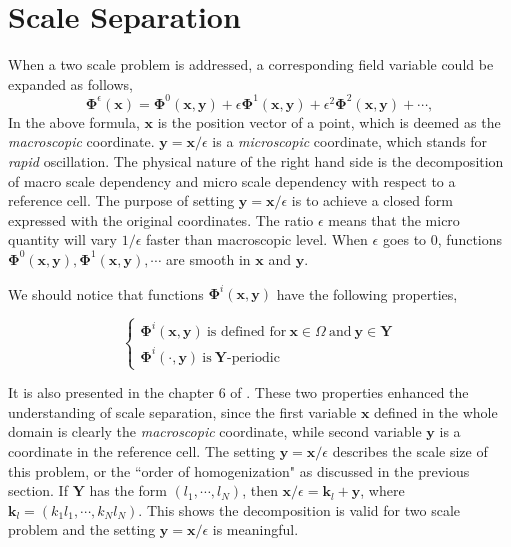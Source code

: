 \documentclass[10pt,a4paper]{scrreprt}
\begin{document}
\section{Scale Separation}
When a two scale problem is addressed, a corresponding field variable could be expanded as follows, 
%
\begin{equation}
\label{eq:field epsi}
\mathbf{\Phi}^{\epsilon}(\mathbf{x}) = \mathbf{\Phi}^{0}(\mathbf{x},\mathbf{y}) + \epsilon\mathbf{\Phi}^{1}(\mathbf{x},\mathbf{y}) + \epsilon^{2} \mathbf{\Phi}^{2}(\mathbf{x},\mathbf{y}) + \cdots,
\end{equation}
%
In the above formula, $\mathbf{x}$ is the position vector of a point, which is deemed as the \textit{macroscopic} coordinate. $\mathbf{y}=\mathbf{x}/\epsilon$ is a \textit{microscopic} coordinate, which stands for \textit{rapid} oscillation. The physical nature of the right hand side is the decomposition of macro scale dependency and micro scale dependency with respect to a reference cell. The purpose of setting $\mathbf{y}=\mathbf{x}/\epsilon$ is to achieve a closed form expressed with the original coordinates. The ratio $\epsilon$ means that the micro quantity will vary $1/\epsilon$ faster than macroscopic level. When $\epsilon$ goes to $0$, functions $\mathbf{\Phi}^{0}(\mathbf{x}, \mathbf{y}), \mathbf{\Phi}^{1}(\mathbf{x}, \mathbf{y}), \cdots$ are smooth in $\mathbf{x}$ and $\mathbf{y}$.

We should notice that functions $\mathbf{\Phi}^{i}(\mathbf{x},\mathbf{y})$ have the following properties,

\begin{equation}
\label{eq:scale separ prop}
\left\{
\begin{array}{l}
\mathbf{\Phi}^{i}(\mathbf{x},\mathbf{y}) \ \text{is defined for} \ \mathbf{x} \in \Omega \ \text{and} \ \mathbf{y} \in \mathbf{Y} \\
\mathbf{\Phi}^{i}(\cdot, \mathbf{y}) \ \text{is} \ \mathbf{Y} \text{-periodic} 
\end{array}
\right.
\end{equation}

It is also presented in the chapter 6 of \citep{cioranescu_introduction_2000}. These two properties enhanced the understanding of scale separation, since the first variable $\mathbf{x}$ defined in the whole domain is clearly the \textit{macroscopic} coordinate, while second variable $\mathbf{y}$ is a coordinate in the reference cell. The setting $\mathbf{y}=\mathbf{x}/\epsilon$ describes the scale size of this problem, or the ``order of homogenization" as discussed in the previous section. If $\mathbf{Y}$ has the form $(l_{1}, \cdots, l_{N})$, then $\mathbf{x}/\epsilon = \mathbf{k}_{l} + \mathbf{y}$, where $\mathbf{k}_{l} = (k_{1}l_{1}, \cdots, k_{N}l_{N})$. This shows the decomposition is valid for two scale problem and the setting $\mathbf{y}=\mathbf{x}/\epsilon$ is meaningful.
\end{document}
